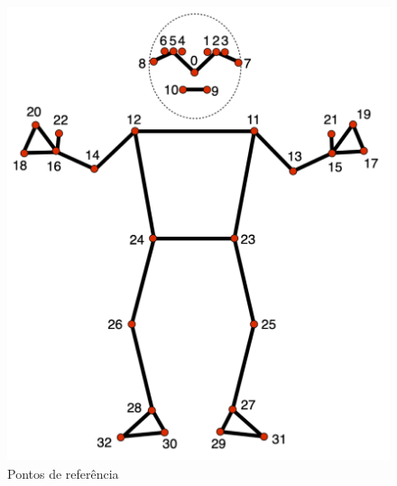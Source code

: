 \begin{itemize}
\begin{figure}[!htb]
	\centering
	\includegraphics[scale=0.3]{figuras/eph/pose_landmarks.png}
	\caption{Pontos de referência}
	\label{fig:Pontos de referencia}
\end{figure}


\end{itemize}
